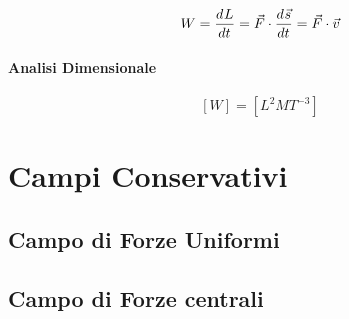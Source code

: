 \begin{equation}
  W = \frac{d^{} L}{d t^{}} = \vec{F} \cdot \frac{d^{} \vec{s}}{d t^{}} = \vec{F} \cdot \vec{v}
\end{equation}

\paragraph{Analisi Dimensionale}

\begin{equation}
  \left[W\right] = \left[L^2 M T^{-3}\right]
\end{equation}

\section{Campi Conservativi}

\subsection{Campo di Forze Uniformi}

\subsection{Campo di Forze centrali}